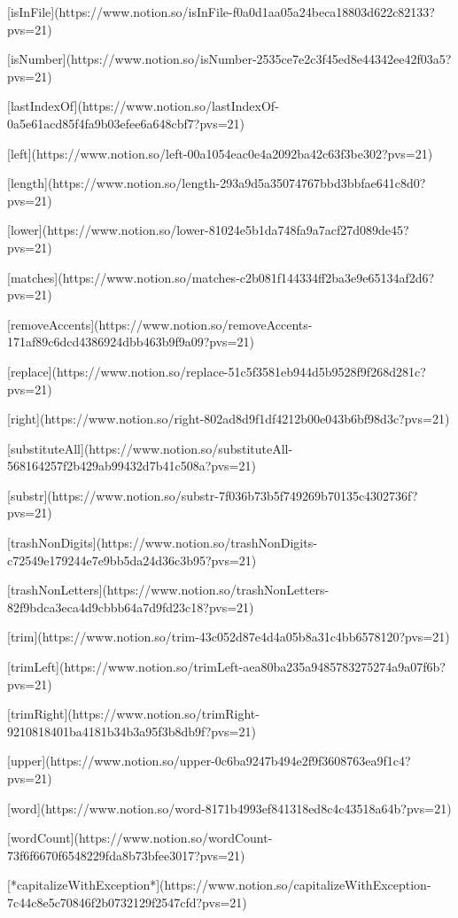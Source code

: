 [isInFile](https://www.notion.so/isInFile-f0a0d1aa05a24beca18803d622c82133?pvs=21)

[isNumber](https://www.notion.so/isNumber-2535ce7e2c3f45ed8e44342ee42f03a5?pvs=21)

[lastIndexOf](https://www.notion.so/lastIndexOf-0a5e61acd85f4fa9b03efee6a648cbf7?pvs=21)

[left](https://www.notion.so/left-00a1054eac0e4a2092ba42c63f3be302?pvs=21)

[length](https://www.notion.so/length-293a9d5a35074767bbd3bbfae641c8d0?pvs=21)

[lower](https://www.notion.so/lower-81024e5b1da748fa9a7acf27d089de45?pvs=21)

[matches](https://www.notion.so/matches-c2b081f144334ff2ba3e9e65134af2d6?pvs=21)

[removeAccents](https://www.notion.so/removeAccents-171af89c6dcd4386924dbb463b9f9a09?pvs=21)

[replace](https://www.notion.so/replace-51c5f3581eb944d5b9528f9f268d281c?pvs=21)

[right](https://www.notion.so/right-802ad8d9f1df4212b00e043b6bf98d3c?pvs=21)

[substituteAll](https://www.notion.so/substituteAll-568164257f2b429ab99432d7b41c508a?pvs=21)

[substr](https://www.notion.so/substr-7f036b73b5f749269b70135c4302736f?pvs=21)

[trashNonDigits](https://www.notion.so/trashNonDigits-c72549e179244e7e9bb5da24d36c3b95?pvs=21)

[trashNonLetters](https://www.notion.so/trashNonLetters-82f9bdca3eca4d9cbbb64a7d9fd23c18?pvs=21)

[trim](https://www.notion.so/trim-43c052d87e4d4a05b8a31c4bb6578120?pvs=21)

[trimLeft](https://www.notion.so/trimLeft-aea80ba235a9485783275274a9a07f6b?pvs=21)

[trimRight](https://www.notion.so/trimRight-9210818401ba4181b34b3a95f3b8db9f?pvs=21)

[upper](https://www.notion.so/upper-0c6ba9247b494e2f9f3608763ea9f1c4?pvs=21)

[word](https://www.notion.so/word-8171b4993ef841318ed8c4c43518a64b?pvs=21)

[wordCount](https://www.notion.so/wordCount-73f6f6670f6548229fda8b73bfee3017?pvs=21)

[*capitalizeWithException*](https://www.notion.so/capitalizeWithException-7c44c8e5c70846f2b0732129f2547cfd?pvs=21)

